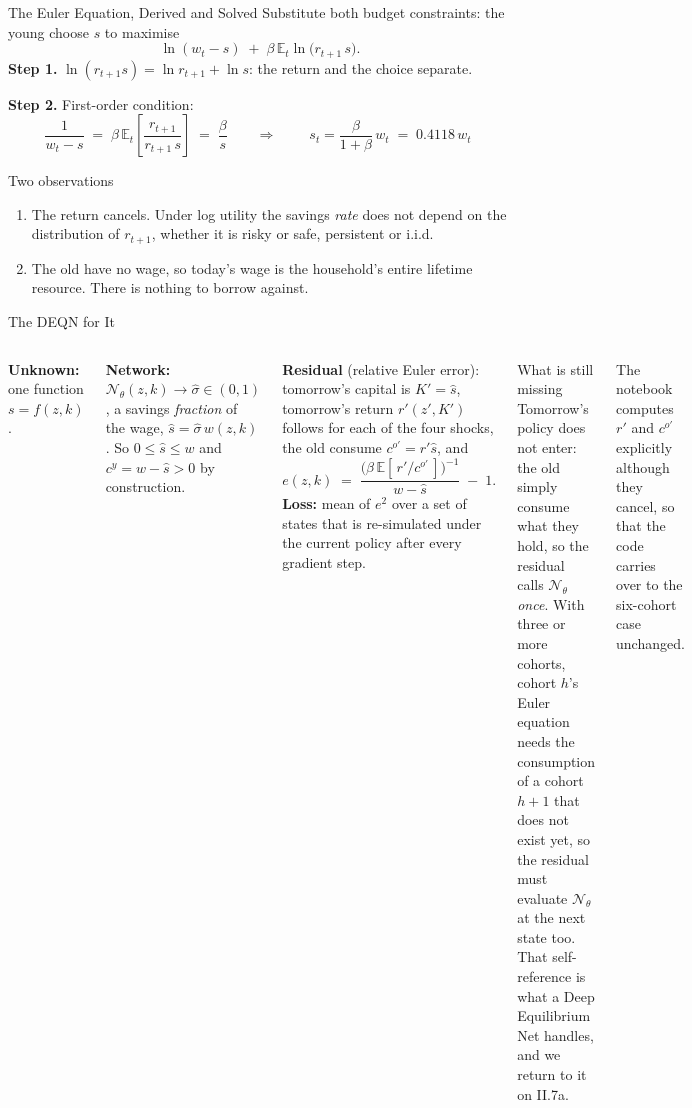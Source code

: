 \documentclass[aspectratio=169,11pt]{beamer}
\newcommand{\emphc}[1]{\textcolor{harvardcrimson}{#1}}
\newcommand{\N}{\mathcal{N}}
\begin{document}
\begin{frame}{The Euler Equation, Derived and Solved}
\small
Substitute both budget constraints: the young choose $s$ to maximise
\[
\ln(w_t - s) \;+\; \beta\,\mathbb{E}_t \ln\bigl(r_{t+1}\,s\bigr).
\]
\textbf{Step 1.}  $\ln(r_{t+1}s) = \ln r_{t+1} + \ln s$: the return and the choice \emphc{separate}.

\textbf{Step 2.}  First-order condition:
\[
\frac{1}{w_t - s} \;=\; \beta\,\mathbb{E}_t\!\left[\frac{r_{t+1}}{r_{t+1}\,s}\right] \;=\; \frac{\beta}{s}
\qquad\Longrightarrow\qquad
\boxed{\;s_t = \frac{\beta}{1+\beta}\,w_t \;=\; 0.4118\,w_t\;}
\]

\vspace{0.3em}
\begin{block}{Two observations}
\vspace{-2pt}\begin{enumerate}\itemsep1pt
    \item The return cancels. Under log utility the savings \emph{rate} does not depend on the
          distribution of $r_{t+1}$, whether it is risky or safe, persistent or i.i.d.
    \item The old have no wage, so today's wage is the household's entire lifetime resource.
          There is nothing to borrow against.
\end{enumerate}
\end{block}
\end{frame}


\begin{frame}{The DEQN for It}
\small
\begin{columns}[T]
\textbf{Unknown:} one function $s = f(z,k)$.

\textbf{Network:} $\N_\theta(z,k)\to\hat\sigma\in(0,1)$, a savings \emph{fraction} of the wage,
$\hat s = \hat\sigma\,w(z,k)$. So $0\le \hat s\le w$ and $c^y = w-\hat s > 0$ by construction.

\textbf{Residual} (relative Euler error): tomorrow's capital is $K'=\hat s$, tomorrow's return
$r'(z',K')$ follows for each of the four shocks, the old consume $c^{o\prime}=r'\hat s$, and
\[
e(z,k) \;=\; \frac{\bigl(\beta\,\mathbb{E}[\,r'/c^{o\prime}\,]\bigr)^{-1}}{w-\hat s} \;-\; 1 .
\]
\textbf{Loss:} mean of $e^2$ over a set of states that is re-simulated under the current policy
after every gradient step.

\begin{block}{What is still missing}
Tomorrow's policy does not enter: the old simply consume what they hold, so the residual calls
$\N_\theta$ \emph{once}.  With three or more cohorts, cohort $h$'s Euler equation needs the consumption
of a cohort $h+1$ that does not exist yet, so the residual must evaluate $\N_\theta$ at the next state
too.  That self-reference is what a Deep Equilibrium Net handles, and we return to it on II.7a.
\end{block}
\vspace{0.3em}
{\footnotesize The notebook computes $r'$ and $c^{o\prime}$ explicitly although they cancel, so that
the code carries over to the six-cohort case unchanged.}
\end{columns}
\end{frame}
\end{document}
